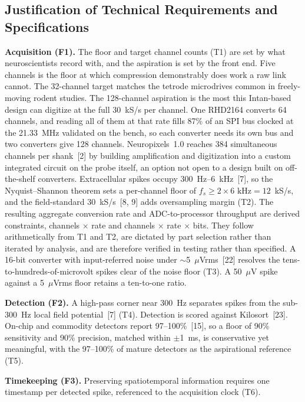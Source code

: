 \documentclass[11pt]{article}
\begin{document}
\subsection{Justification of Technical Requirements and Specifications}
\textbf{Acquisition (F1).} The floor and target channel counts (T1) are set by what
neuroscientists record with, and the aspiration is set by the front end. Five channels is
the floor at which compression demonstrably does work a raw link cannot. The 32-channel
target matches the tetrode microdrives common in freely-moving rodent studies. The
128-channel aspiration is the most this Intan-based design can digitize at the full
30~kS/s per channel. One RHD2164 converts 64 channels, and reading all of them at that rate
fills 87\% of an SPI bus clocked at the 21.33~MHz validated on the bench, so each converter
needs its own bus and two converters give 128 channels. Neuropixels~1.0 reaches 384
simultaneous channels per shank~[2] by building amplification and digitization into a
custom integrated circuit on the probe itself, an option not open to a design built on
off-the-shelf converters. Extracellular spikes occupy
300~Hz--6~kHz~[7], so the Nyquist--Shannon theorem sets a per-channel floor of
$f_s \geq 2 \times 6\text{~kHz} = 12$~kS/s, and the field-standard
30~kS/s~[8, 9] adds oversampling margin (T2). The resulting aggregate conversion rate and
ADC-to-processor throughput are derived constraints, channels $\times$ rate and channels
$\times$ rate $\times$ bits. They follow arithmetically from T1 and T2, are dictated by
part selection rather than iterated by analysis, and are therefore verified in testing
rather than specified. A 16-bit converter with input-referred noise under
$\sim$5~$\mu$Vrms~[22] resolves the tens-to-hundreds-of-microvolt spikes clear of the
noise floor (T3). A 50~$\mu$V spike against a 5~$\mu$Vrms floor retains a ten-to-one ratio.

\textbf{Detection (F2).} A high-pass corner near 300~Hz separates spikes from the sub-300~Hz
local field potential~[7] (T4). Detection is scored against Kilosort~[23]. On-chip and
commodity detectors report 97--100\%~[15], so a floor of 90\% sensitivity and 90\%
precision, matched within $\pm$1~ms, is conservative yet meaningful, with the
97--100\% of mature detectors as the aspirational reference (T5).

\textbf{Timekeeping (F3).} Preserving spatiotemporal information requires one timestamp per
detected spike, referenced to the acquisition clock (T6).
\end{document}
